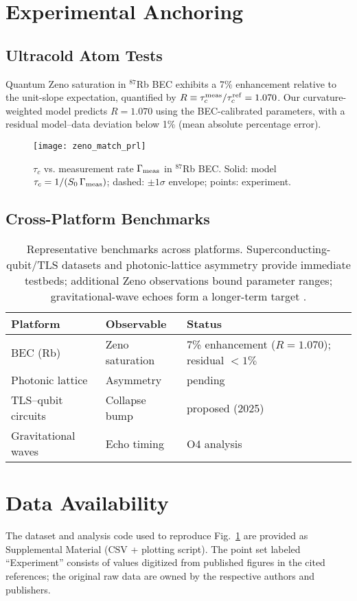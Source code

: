 \documentclass[aps,prl,twocolumn,nofootinbib]{revtex4-2}
\begin{document}
\section{Experimental Anchoring}

\subsection{Ultracold Atom Tests}
Quantum Zeno saturation in $^{87}$Rb BEC exhibits a 7\% enhancement relative to the unit-slope expectation,
quantified by $R\equiv \tau_c^{\rm meas}/\tau_c^{\rm ref}=1.070$.
Our curvature-weighted model predicts $R=1.070$ using the BEC-calibrated parameters, with a residual model--data
deviation below 1\% (mean absolute percentage error).

\begin{figure}[h]
  \texttt{[image: zeno\_match\_prl]}
  \caption{$\tau_c$ vs. measurement rate $\Gamma_{\rm meas}$ in $^{87}$Rb BEC.
  Solid: model $\tau_c=1/(S_0\,\Gamma_{\rm meas})$; dashed: $\pm1\sigma$ envelope; points: experiment.}
  \label{fig:zeno}
\end{figure}

\subsection{Cross-Platform Benchmarks}
\begin{table}[h]
\centering
\begin{tabular}{lll}
\hline
Platform & Observable & Status \\
\hline
BEC (Rb) & Zeno saturation & 7\% enhancement ($R=1.070$); residual $<1\%$ \\
Photonic lattice & Asymmetry & pending \cite{Seron2023} \\
TLS--qubit circuits & Collapse bump & proposed (2025) \\
Gravitational waves & Echo timing & O4 analysis \\
\hline
\end{tabular}
\caption{Representative benchmarks across platforms.
Superconducting-qubit/TLS datasets \cite{Yu2005,Serniak2019,Klimov2018,Burnett2019}
and photonic-lattice asymmetry \cite{Seron2023} provide immediate testbeds;
additional Zeno observations \cite{Itano1990,Harrington2017,Alessandrini2024} bound parameter ranges;
gravitational-wave echoes form a longer-term target \cite{Cardoso2016}.}
\end{table}

\section*{Data Availability}
The dataset and analysis code used to reproduce Fig.~\ref{fig:zeno} are provided as Supplemental Material (CSV + plotting script). The point set labeled ``Experiment'' consists of values digitized from published figures in the cited references; the original raw data are owned by the respective authors and publishers.
\end{document}
